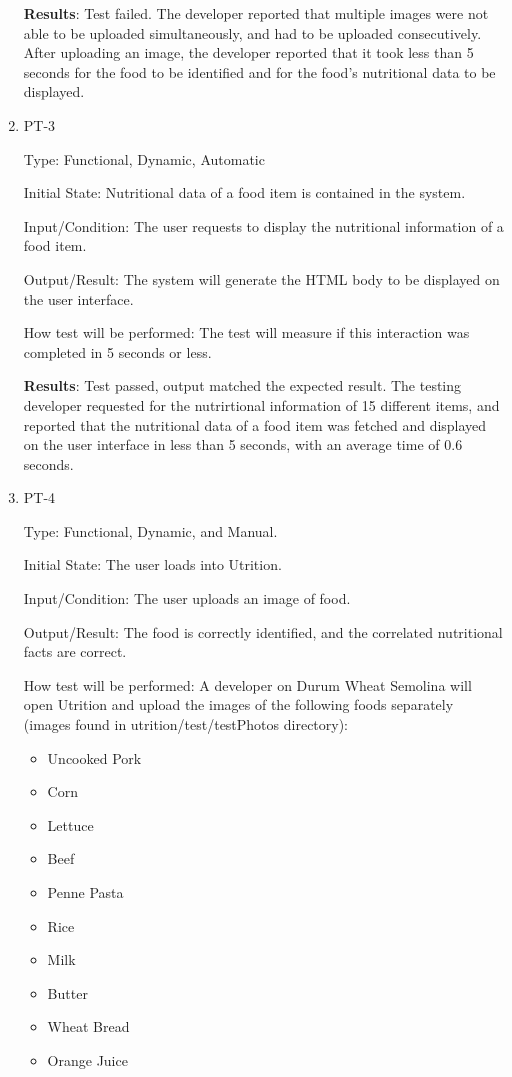 \documentclass[12pt, titlepage]{article}
\begin{document}
\begin{enumerate}
		\textbf{Results}: Test failed. The developer reported that multiple images were not able to be uploaded simultaneously, and had to be uploaded consecutively. After uploading an image, the developer reported that it took less than 5 seconds for the food to be identified and for the food's nutritional data to be displayed.
		
		\item{PT-3}
		
		Type: Functional, Dynamic, Automatic
		
		Initial State: Nutritional data of a food item is contained in the 
		system.
		
		Input/Condition: The user requests to display the nutritional information of a 
		food item.
		
		Output/Result: The system will generate the HTML body to be displayed on 
		the user 
		interface.
		
		How test will be performed: The test will measure if this interaction 
		was completed in 5 seconds or less.
		
		\textbf{Results}: Test passed, output matched the expected result. The testing developer requested for the nutrirtional information of 15 different items, and reported that the nutritional data of a food item was fetched and displayed on the user interface in less than 5 seconds, with an average time of 0.6 seconds.
		
		\item{PT-4} 
		
		Type: Functional, Dynamic, and Manual.
		
		Initial State: The user loads into Utrition.
		
		Input/Condition: The user uploads an image of food.
		
		Output/Result: The food is correctly identified, and the correlated nutritional facts are correct.
		
		How test will be performed: A developer on Durum Wheat Semolina will open Utrition and upload the images of the following foods separately (images found in utrition/test/testPhotos directory):
		\begin{itemize}
			\item Uncooked Pork
			\item Corn
			\item Lettuce
			\item Beef
			\item Penne Pasta
			\item Rice
			\item Milk
			\item Butter
			\item Wheat Bread
			\item Orange Juice
		\end{itemize} 
		

\end{enumerate}
\end{document}
